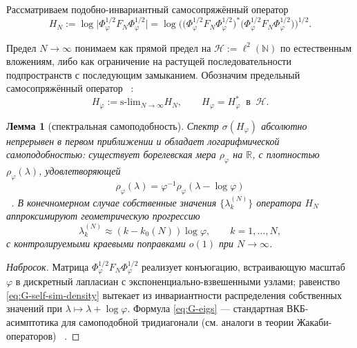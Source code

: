 \documentclass{article}
\numberwithin{equation}{section}
\theoremstyle{plain}
\newtheorem{lemma}{Лемма}
\theoremstyle{definition}
\theoremstyle{remark}
\def\rho{ρ}\def\sigma{σ}\def\Sigma{Σ}\def\tau{τ}%
\def\infty{∞}\def\partial{∂}\def\sum{Σ}\def\int{∫}%
\begin{document}
Рассматриваем подобно-инвариантный самосопряжённый оператор
\begin{equation}\label{eq:G-HN}
H_N:=\log\!\big|\Phi_\varphi^{1/2}F_N\Phi_\varphi^{1/2}\big|
=\log\!\Big(\big(\Phi_\varphi^{1/2}F_N\Phi_\varphi^{1/2}\big)^\ast
\big(\Phi_\varphi^{1/2}F_N\Phi_\varphi^{1/2}\big)\Big)^{1/2}.
\end{equation}

Предел \( N\to\infty \) понимаем как прямой предел на 
\(\mathcal H:=\ell^2(\mathbb N)\) 
по естественным вложениям, либо как ограничение на растущей последовательности подпространств с последующим замыканием. Обозначим предельный самосопряжённый оператор ~\cite{Kohmoto1983}:
\begin{equation}\label{eq:G-Hphi}
H_\varphi:=\mathrm{s\mbox{-}lim}_{N\to\infty} H_N,
\qquad 
H_\varphi=H_\varphi^\ast\ \text{ в }\ \mathcal H.
\end{equation}

\begin{lemma}[спектральная самоподобность]\label{lem:G-spectrum}
Спектр \( \sigma(H_\varphi) \) абсолютно непрерывен в первом приближении и обладает логарифмической самоподобностью: существует борелевская мера \( \rho_\varphi \) на \( \mathbb R \), с плотностью \( \rho_\varphi(\lambda) \), удовлетворяющей
\begin{equation}\label{eq:G-self-sim-density}
\rho_\varphi(\lambda)=\varphi^{-1}\rho_\varphi(\lambda-\log\varphi)
\end{equation}  ~\cite{Ostlund1983}.
В конечномерном случае собственные значения \( \{\lambda_k^{(N)}\} \) оператора \(H_N\) аппроксимируют геометрическую прогрессию
\begin{equation}\label{eq:G-eigs}
\lambda_k^{(N)}\approx (k-k_0(N))\log\varphi,\qquad k=1,\dots,N,
\end{equation}
с контролируемыми краевыми поправками \(o(1)\) при \(N\to\infty\).
\end{lemma}

\begin{proof}[Набросок]
Матрица \( \Phi_\varphi^{1/2}F_N\Phi_\varphi^{1/2} \) реализует конъюгацию, встраивающую масштаб \(\varphi\) 
в дискретный лапласиан с экспоненциально-взвешенными узлами; равенство \eqref{eq:G-self-sim-density} 
вытекает из инвариантности распределения собственных значений при \(\lambda\mapsto \lambda+\log\varphi\). Формула \eqref{eq:G-eigs} — 
стандартная ВКБ-асимптотика для самоподобной тридиагонали (см. аналоги в теории Жакаби-операторов) ~\cite{Teschl2000}.
\end{proof}
\end{document}

